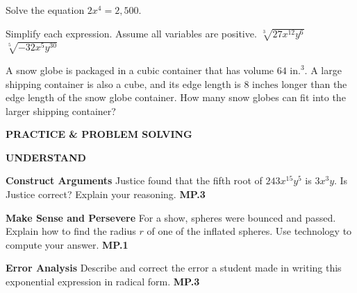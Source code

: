\documentclass{article}
\newenvironment{practice}[2]{}{}
\newcommand{\placeholder}[2]{}
\begin{document}
\begin{practice}{14}{}
Solve the equation $2x^4 = 2,500$.
\end{practice}

Simplify each expression. Assume all variables are positive.
\begin{practice}{15}{}
$\sqrt[3]{27x^{12}y^6}$
\end{practice}
\begin{practice}{16}{}
$\sqrt[5]{-32x^5y^{30}}$
\end{practice}

\begin{practice}{17}{}
A snow globe is packaged in a cubic container that has volume $64 \text{ in.}^3$. A large shipping container is also a cube, and its edge length is $8 \text{ inches}$ longer than the edge length of the snow globe container. How many snow globes can fit into the larger shipping container?
\end{practice}

\textbf{PRACTICE \& PROBLEM SOLVING}

\textbf{UNDERSTAND}

\begin{practice}{18}{}
\textbf{Construct Arguments} Justice found that the fifth root of $243x^{15}y^5$ is $3x^3y$. Is Justice correct? Explain your reasoning. \textbf{MP.3}
\end{practice}

\begin{practice}{19}{}
\textbf{Make Sense and Persevere} For a show, spheres were bounced and passed. Explain how to find the radius $r$ of one of the inflated spheres. Use technology to compute your answer. \textbf{MP.1}

\placeholder{photo}{Many large colorful inflated spheres floating above a crowd. Label 'Volume of a sphere is $4,186 \frac{2}{3} \text{ in.}^3$'.}
\end{practice}

\begin{practice}{20}{}
\textbf{Error Analysis} Describe and correct the error a student made in writing this exponential expression in radical form. \textbf{MP.3}

\end{practice}
\end{document}
